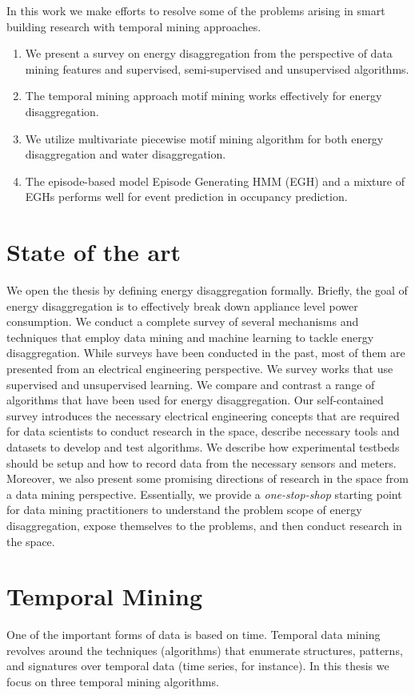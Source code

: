 In this work we make efforts to resolve some of the problems arising in smart building research with 
temporal mining approaches.
\begin{enumerate}
	\item We present a survey on energy disaggregation from the perspective of data mining features and supervised, semi-supervised and unsupervised algorithms. 
	\item The temporal mining approach motif mining works effectively for energy disaggregation. 
	\item We utilize multivariate piecewise motif mining algorithm for both energy disaggregation and water disaggregation. 
	\item The episode-based model Episode Generating HMM (EGH) and a mixture of EGHs performs well for event prediction in occupancy prediction. 
\end{enumerate}
\section{State of the art}
We open the thesis by defining energy disaggregation formally. Briefly, the goal of energy disaggregation is to effectively break down appliance level power consumption. We conduct a complete survey of several mechanisms and techniques that employ data mining and machine learning to tackle energy disaggregation. While surveys have been conducted in the past, most of them are presented from an electrical engineering perspective. We survey works that use supervised and unsupervised learning. We compare and contrast a range of algorithms that have been used for energy disaggregation. Our self-contained survey introduces the necessary electrical engineering concepts that are required for data scientists to conduct research in the space, describe necessary tools and datasets to develop and test algorithms. We describe how experimental testbeds should be setup and how to record data from the necessary sensors and meters. Moreover, we also present some promising directions of research in the space from a data mining perspective. Essentially, we provide a \emph{one-stop-shop} starting point for data mining practitioners to understand the problem scope of energy disaggregation, expose themselves to the problems, and then conduct research in the space.

\section{Temporal Mining}
One of the important forms of data is based on time. Temporal data mining revolves around the techniques (algorithms) that enumerate structures, patterns, and signatures over temporal data (time series, for instance). In this thesis we focus on three temporal mining algorithms. 

